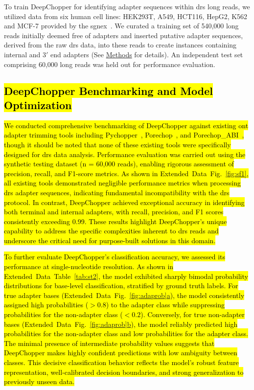\documentclass[pdflatex,sn-nature, lineno]{sn-jnl}%
\newcommand{\edfigref}[2]{Extended Data Fig.~\hyperref[#1]{\ref*{#1}#2}}
\newcommand{\edtableref}[2]{Extended Data Table~\hyperref[#1]{\ref*{#1}#2}}
\begin{document}
To train DeepChopper for identifying adapter sequences within \gls{drs} long reads, we utilized data from six human cell lines: HEK293T, A549, HCT116, HepG2, K562 and MCF-7 provided by the \gls{sgnex}~\cite{chen2021systematic}.
We curated a training set of 540,000 long reads initially deemed free of adapters and inserted putative adapter sequences, derived from the raw \gls{drs} data, into these reads to create instances containing internal and $3'$ end adapters (See \hyperref[sec:methods]{Methods} for details).
An independent test set comprising 60,000 long reads was held out for performance evaluation.

\subsection{\hl{DeepChopper Benchmarking and Model Optimization}}

\hl{We conducted comprehensive benchmarking of DeepChopper against existing \mbox{\gls{ont}} adapter trimming tools including Pychopper\mbox{~\cite{pychopper}}, Porechop\mbox{~\cite{Wick2017}}, and Porechop\_ABI\mbox{~\cite{bonenfant2023porechop}}, though it should be noted that none of these existing tools were specifically designed for \mbox{\gls{drs}} data analysis.
	Performance evaluation was carried out using the synthetic testing dataset (n = 60,000 reads), enabling rigorous assessment of precision, recall, and F1-score metrics.
	As shown in \mbox{\edfigref{fig:sf1}{}}, all existing tools demonstrated negligible performance metrics when processing \mbox{\gls{drs}} adapter sequences, indicating fundamental incompatibility with the \mbox{\gls{drs}} protocol.
	In contrast, DeepChopper achieved exceptional accuracy in identifying both terminal and internal adapters, with recall, precision, and F1 scores consistently exceeding 0.99.
	These results highlight DeepChopper's unique capability to address the specific complexities inherent to \mbox{\gls{drs}} reads and underscore the critical need for purpose-built solutions in this domain.}

\hl{To further evaluate DeepChopper’s classification accuracy, we assessed its performance at single-nucleotide resolution. As shown in \mbox{\edtableref{tab:st2}{}}, the model exhibited sharply bimodal probability distributions for base-level classification, stratified by ground truth labels. For true adapter bases (\mbox{\edfigref{fig:adaprob}{a}}), the model consistently assigned high probabilities ($>0.8$) to the adapter class while suppressing probabilities for the non-adapter class ($<0.2$).
	Conversely, for true non-adapter bases (\mbox{\edfigref{fig:adaprob}{b}}), the model reliably predicted high probabilities for the non-adapter class and low probabilities for the adapter class.
	The minimal presence of intermediate probability values suggests that DeepChopper makes highly confident predictions with low ambiguity between classes.
	This decisive classification behavior reflects the model’s robust feature representation, well-calibrated decision boundaries, and strong generalization to previously unseen data.}
\end{document}
